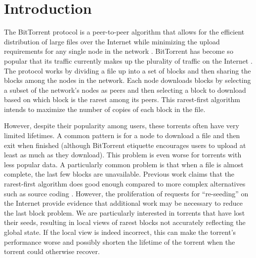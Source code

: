 \section{Introduction}

The BitTorrent protocol is a peer-to-peer algorithm that allows for
the efficient distribution of large files over the Internet while
minimizing the upload requirements for any single node in the network
\cite{bep003}. BitTorrent has become so popular that its traffic currently
makes up the plurality of traffic on the Internet \cite{istudy08}. The
protocol works by dividing a file up into a set of blocks and then
sharing the blocks among the nodes in the network. Each node downloads
blocks by selecting a subset of the network's nodes as peers and then
selecting a block to download based on which block is the rarest among
its peers. This rarest-first algorithm intends to maximize the number
of copies of each block in the file.


However, despite their popularity among users, these torrents often have
very limited lifetimes. A common pattern is for a node to download a file
and then exit when finished (although BitTorrent etiquette encourages users to upload at
least as much as they download). This problem is even worse for torrents
with less popular data. A particularly common problem is that when a file
is almost complete, the last few blocks are unavailable. Previous work
claims that the rarest-first algorithm does good enough compared to
more complex alternatives such as source coding \cite{legout:1}. However,
the proliferation of requests for ``re-seeding'' on the Internet provide
evidence that additional work may be necessary to reduce the last block
problem. We are particularly interested in torrents that have lost
their seeds, resulting in local views of rarest blocks not accurately
reflecting the global state. If the local view is indeed incorrect,
this can make the torrent's performance worse and possibly shorten the
lifetime of the torrent when the torrent could otherwise recover.





